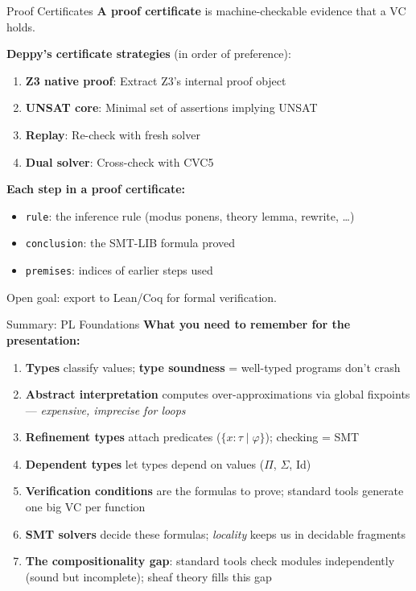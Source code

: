 \documentclass[aspectratio=169,10pt]{beamer}
\begin{document}
\begin{frame}{Proof Certificates}
\textbf{A proof certificate} is machine-checkable evidence that a VC holds.

\textbf{Deppy's certificate strategies} (in order of preference):
\begin{enumerate}
  \item \textbf{Z3 native proof}: Extract Z3's internal proof object
  \item \textbf{UNSAT core}: Minimal set of assertions implying UNSAT
  \item \textbf{Replay}: Re-check with fresh solver
  \item \textbf{Dual solver}: Cross-check with CVC5
\end{enumerate}

\vspace{0.3em}
\textbf{Each step in a proof certificate:}
\begin{itemize}
  \item \texttt{rule}: the inference rule (modus ponens, theory lemma, rewrite, \ldots)
  \item \texttt{conclusion}: the SMT-LIB formula proved
  \item \texttt{premises}: indices of earlier steps used
\end{itemize}

\vspace{0.3em}
Open goal: export to Lean/Coq for formal verification.
\end{frame}

\begin{frame}{Summary: PL Foundations}
\textbf{What you need to remember for the presentation:}

\begin{enumerate}
  \item \textbf{Types} classify values; \textbf{type soundness} = well-typed programs don't crash
  \item \textbf{Abstract interpretation} computes over-approximations via global fixpoints --- \emph{expensive, imprecise for loops}
  \item \textbf{Refinement types} attach predicates ($\{x : \tau \mid \varphi\}$); checking = SMT
  \item \textbf{Dependent types} let types depend on values ($\Pi$, $\Sigma$, Id)
  \item \textbf{Verification conditions} are the formulas to prove; standard tools generate one big VC per function
  \item \textbf{SMT solvers} decide these formulas; \emph{locality} keeps us in decidable fragments
  \item \textbf{The compositionality gap}: standard tools check modules independently (sound but incomplete); sheaf theory fills this gap
\end{enumerate}
\end{frame}
\end{document}
